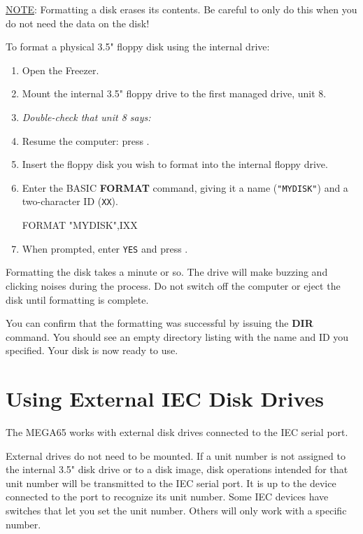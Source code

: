 \underline{NOTE}: Formatting a disk erases its contents. Be careful to only do this when you do not need the data on the disk!

To format a physical 3.5" floppy disk using the internal drive:

\begin{enumerate}
\item Open the Freezer.
\item Mount the internal 3.5" floppy drive to the first managed drive, unit 8.
\item {\it Double-check that unit 8 says:} 
\item Resume the computer: press .
\item Insert the floppy disk you wish to format into the internal floppy drive.
\item Enter the BASIC {\bf FORMAT} command, giving it a name ({\tt "MYDISK"}) and a two-character ID ({\tt XX}).
\begin{screencode}
FORMAT "MYDISK",IXX
\end{screencode}
\item When prompted, enter {\tt YES} and press .
\end{enumerate}

Formatting the disk takes a minute or so. The drive will make buzzing and clicking noises during the process. Do not switch off the computer or eject the disk until formatting is complete.

You can confirm that the formatting was successful by issuing the {\bf DIR} command. You should see an empty directory listing with the name and ID you specified. Your disk is now ready to use.


\section{Using External IEC Disk Drives}

The MEGA65 works with external disk drives connected to the IEC serial port.

External drives do not need to be mounted. If a unit number is not assigned to the internal 3.5" disk drive or to a disk image, disk operations intended for that unit number will be transmitted to the IEC serial port. It is up to the device connected to the port to recognize its unit number. Some IEC devices have switches that let you set the unit number. Others will only work with a specific number.

